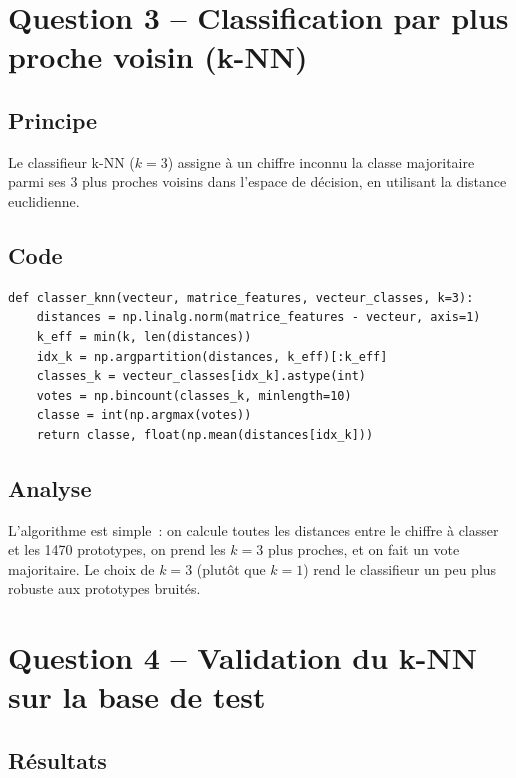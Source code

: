 \documentclass[a4paper,11pt]{article}
\begin{document}
\section{Question 3 -- Classification par plus proche voisin (k-NN)}

\subsection{Principe}

Le classifieur k-NN ($k=3$) assigne à un chiffre inconnu la classe majoritaire parmi ses 3 plus proches voisins dans l'espace de décision, en utilisant la distance euclidienne.

\subsection{Code}

\begin{lstlisting}[style=python, caption={Classifieur k-NN.}]
def classer_knn(vecteur, matrice_features, vecteur_classes, k=3):
    distances = np.linalg.norm(matrice_features - vecteur, axis=1)
    k_eff = min(k, len(distances))
    idx_k = np.argpartition(distances, k_eff)[:k_eff]
    classes_k = vecteur_classes[idx_k].astype(int)
    votes = np.bincount(classes_k, minlength=10)
    classe = int(np.argmax(votes))
    return classe, float(np.mean(distances[idx_k]))
\end{lstlisting}

\subsection{Analyse}

L'algorithme est simple~: on calcule toutes les distances entre le chiffre à classer et les 1470 prototypes, on prend les $k=3$ plus proches, et on fait un vote majoritaire. Le choix de $k=3$ (plutôt que $k=1$) rend le classifieur un peu plus robuste aux prototypes bruités.

\section{Question 4 -- Validation du k-NN sur la base de test}

\subsection{Résultats}
\end{document}
